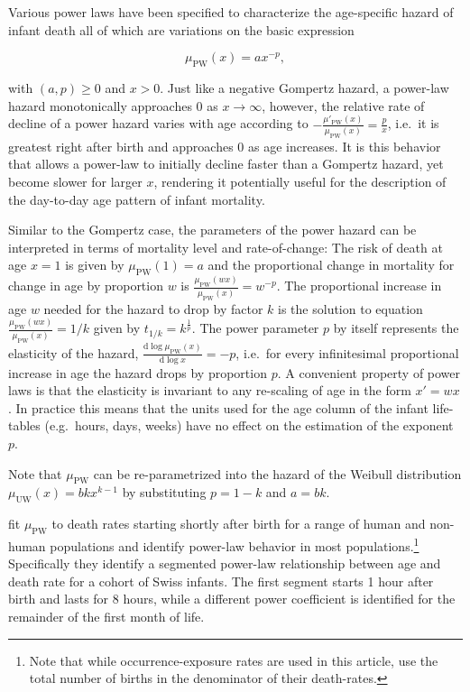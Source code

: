 \documentclass[10pt, twoside, parskip=half]{article}
\begin{document}
Various power laws have been specified to characterize the age-specific
hazard of infant death
\citep{Oppermann1870, Brillinger1961, Choe1981, DeBeer2016, Berrut2016}
all of which are variations on the basic expression

\[
\mu_\text{PW}(x)=ax^{-p},
\]

with \((a,p)\geq0\) and \(x>0\). Just like a negative Gompertz hazard, a
power-law hazard monotonically approaches 0 as \(x\rightarrow\infty\),
however, the relative rate of decline of a power hazard varies with age
according to
\(-\frac{\mu'_\text{PW}(x)}{\mu_\text{PW}(x)} =\frac{p}{x}\), i.e.~it is
greatest right after birth and approaches 0 as age increases. It is this
behavior that allows a power-law to initially decline faster than a
Gompertz hazard, yet become slower for larger \(x\), rendering it
potentially useful for the description of the day-to-day age pattern of
infant mortality.

Similar to the Gompertz case, the parameters of the power hazard can be
interpreted in terms of mortality level and rate-of-change: The risk of
death at age \(x=1\) is given by \(\mu_\text{PW}(1)=a\) and the
proportional change in mortality for change in age by proportion \(w\)
is \(\frac{\mu_\text{PW}(wx)}{\mu_\text{PW}(x)}=w^{-p}\). The
proportional increase in age \(w\) needed for the hazard to drop by
factor \(k\) is the solution to equation
\(\frac{\mu_\text{PW}(wx)}{\mu_\text{PW}(x)}=1/k\) given by
\(t_{1/k}= k^{\frac{1}{p}}\). The power parameter \(p\) by itself
represents the elasticity of the hazard,
\(\frac{\text{d}\log\mu_\text{PW}(x)}{\text{d}\log x}=-p\), i.e.~for
every infinitesimal proportional increase in age the hazard drops by
proportion \(p\). A convenient property of power laws is that the
elasticity is invariant to any re-scaling of age in the form \(x'=wx\).
In practice this means that the units used for the age column of the
infant life-tables (e.g.~hours, days, weeks) have no effect on the
estimation of the exponent \(p\).

Note that \(\mu_\text{PW}\) can be re-parametrized into the hazard of
the Weibull distribution \(\mu_\text{UW}(x)=bkx^{k-1}\) by substituting
\(p=1-k\) and \(a=bk\).

\citet{Berrut2016} fit \(\mu_\text{PW}\) to death rates starting shortly
after birth for a range of human and non-human populations and identify
power-law behavior in most populations.\footnote{Note that while
  occurrence-exposure rates are used in this article, \citet{Berrut2016}
  use the total number of births in the denominator of their
  death-rates.} Specifically they identify a segmented power-law
relationship between age and death rate for a cohort of Swiss infants.
The first segment starts 1 hour after birth and lasts for 8 hours, while
a different power coefficient is identified for the remainder of the
first month of life.
\end{document}
